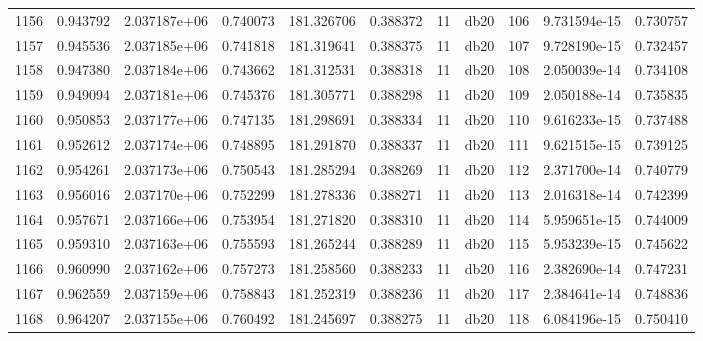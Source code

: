 \begin{tabular}{lrrrrrrlrrr}
1156 &    0.943792 &        2.037187e+06 &  0.740073 &              181.326706 &    0.388372 &      11 &         db20 &    106 &   9.731594e-15 &      0.730757 \\
1157 &    0.945536 &        2.037185e+06 &  0.741818 &              181.319641 &    0.388375 &      11 &         db20 &    107 &   9.728190e-15 &      0.732457 \\
1158 &    0.947380 &        2.037184e+06 &  0.743662 &              181.312531 &    0.388318 &      11 &         db20 &    108 &   2.050039e-14 &      0.734108 \\
1159 &    0.949094 &        2.037181e+06 &  0.745376 &              181.305771 &    0.388298 &      11 &         db20 &    109 &   2.050188e-14 &      0.735835 \\
1160 &    0.950853 &        2.037177e+06 &  0.747135 &              181.298691 &    0.388334 &      11 &         db20 &    110 &   9.616233e-15 &      0.737488 \\
1161 &    0.952612 &        2.037174e+06 &  0.748895 &              181.291870 &    0.388337 &      11 &         db20 &    111 &   9.621515e-15 &      0.739125 \\
1162 &    0.954261 &        2.037173e+06 &  0.750543 &              181.285294 &    0.388269 &      11 &         db20 &    112 &   2.371700e-14 &      0.740779 \\
1163 &    0.956016 &        2.037170e+06 &  0.752299 &              181.278336 &    0.388271 &      11 &         db20 &    113 &   2.016318e-14 &      0.742399 \\
1164 &    0.957671 &        2.037166e+06 &  0.753954 &              181.271820 &    0.388310 &      11 &         db20 &    114 &   5.959651e-15 &      0.744009 \\
1165 &    0.959310 &        2.037163e+06 &  0.755593 &              181.265244 &    0.388289 &      11 &         db20 &    115 &   5.953239e-15 &      0.745622 \\
1166 &    0.960990 &        2.037162e+06 &  0.757273 &              181.258560 &    0.388233 &      11 &         db20 &    116 &   2.382690e-14 &      0.747231 \\
1167 &    0.962559 &        2.037159e+06 &  0.758843 &              181.252319 &    0.388236 &      11 &         db20 &    117 &   2.384641e-14 &      0.748836 \\
1168 &    0.964207 &        2.037155e+06 &  0.760492 &              181.245697 &    0.388275 &      11 &         db20 &    118 &   6.084196e-15 &      0.750410 \\

\end{tabular}
